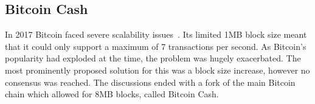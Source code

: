 \subsection{Bitcoin Cash}
In 2017 Bitcoin faced severe scalability issues~\cite{onscaling}. Its limited 1MB block size meant that it could only support a maximum of 7 transactions per second. As Bitcoin's popularity had exploded at the time, the problem was hugely exacerbated. The most prominently proposed solution for this was a block size increase, however no consensus was reached. The discussions ended with a fork of the main Bitcoin chain which allowed for 8MB blocks, called Bitcoin Cash.
